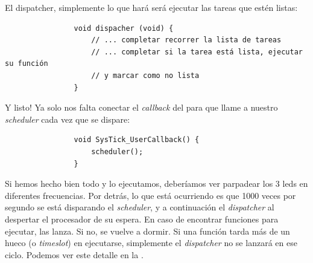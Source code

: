 \documentclass[../main.tex]{subfiles}
\begin{document}
            El dispatcher, simplemente lo que hará será ejecutar las tareas que estén listas:

            \begin{lstlisting}
                void dispacher (void) {
                    // ... completar recorrer la lista de tareas
                    // ... completar si la tarea está lista, ejecutar su función 
                    // y marcar como no lista
                }
            \end{lstlisting}

            Y listo! Ya solo nos falta conectar el \emph{callback} del  para que llame a nuestro \emph{scheduler} cada vez que se dispare:

            \begin{lstlisting}
                void SysTick_UserCallback() {
                    scheduler();
                }
            \end{lstlisting}

            Si hemos hecho bien todo y lo ejecutamos, deberíamos ver parpadear los 3 leds en diferentes frecuencias. Por detrás, lo que está ocurriendo es que 1000 veces por segundo se está disparando el \emph{scheduler}, y a continuación el \emph{dispatcher} al despertar el procesador de su espera. En caso de encontrar funciones para ejecutar, las lanza. Si no, se vuelve a dormir. Si una función tarda más de un hueco (o \emph{timeslot}) en ejecutarse, simplemente el \emph{dispatcher} no se lanzará en ese ciclo. Podemos ver este detalle en la .
\end{document}
